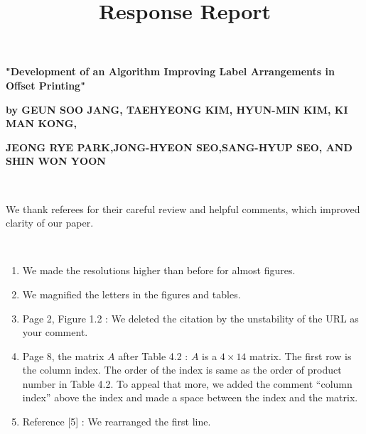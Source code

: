 \documentclass[10pt]{amsart}
\begin{document}
\title[Response Report]
{Response Report}
\maketitle
\centerline{\bf "Development of an Algorithm Improving Label Arrangements in Offset Printing"}
\centerline{\bf by GEUN SOO JANG, TAEHYEONG KIM, HYUN-MIN KIM, KI MAN KONG,}
\centerline{\bf  JEONG RYE PARK,JONG-HYEON SEO,SANG-HYUP SEO, AND SHIN WON YOON}

\

We thank referees for their careful review and helpful comments, which improved clarity of our paper.

\
\begin{enumerate}

\item We made the resolutions higher than before for almost figures.\\

\item We magnified the letters in the figures and tables.\\

\item Page 2, Figure 1.2 : We deleted the citation by the unstability of the URL as your comment.\\

\item Page 8, the matrix $A$ after Table 4.2 : $A$ is a $4 \times 14$ matrix. The first row is the column index.
The order of the index is same as the order of product number in Table 4.2.
To appeal that more, we added the comment ``column index'' above the index and made a space between the index and the matrix.\\

\item Reference [5] : We rearranged the first line.\\

\end{enumerate}
\end{document}
